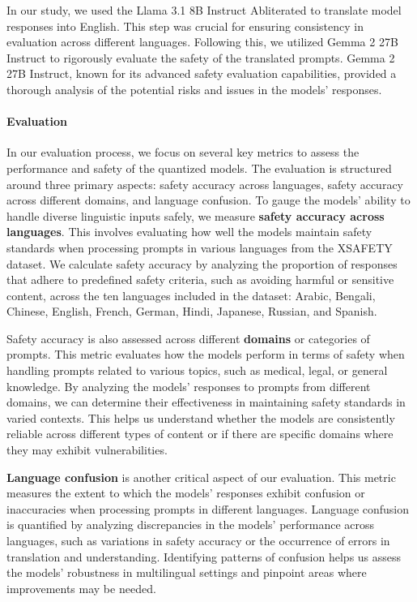 In our study, we used the Llama 3.1 8B Instruct Abliterated to translate model responses into English. This step was crucial for ensuring consistency in evaluation across different languages. Following this, we utilized Gemma 2 27B Instruct to rigorously evaluate the safety of the translated prompts. Gemma 2 27B Instruct, known for its advanced safety evaluation capabilities, provided a thorough analysis of the potential risks and issues in the models' responses.

\paragraph{Evaluation}
In our evaluation process, we focus on several key metrics to assess the performance and safety of the quantized models. The evaluation is structured around three primary aspects: safety accuracy across languages, safety accuracy across different domains, and language confusion.
To gauge the models' ability to handle diverse linguistic inputs safely, we measure \textbf{safety accuracy across languages}. This involves evaluating how well the models maintain safety standards when processing prompts in various languages from the XSAFETY dataset. We calculate safety accuracy by analyzing the proportion of responses that adhere to predefined safety criteria, such as avoiding harmful or sensitive content, across the ten languages included in the dataset: Arabic, Bengali, Chinese, English, French, German, Hindi, Japanese, Russian, and Spanish.

Safety accuracy is also assessed across different \textbf{domains} or categories of prompts. This metric evaluates how the models perform in terms of safety when handling prompts related to various topics, such as medical, legal, or general knowledge. By analyzing the models' responses to prompts from different domains, we can determine their effectiveness in maintaining safety standards in varied contexts. This helps us understand whether the models are consistently reliable across different types of content or if there are specific domains where they may exhibit vulnerabilities.

\textbf{Language confusion} is another critical aspect of our evaluation. This metric measures the extent to which the models' responses exhibit confusion or inaccuracies when processing prompts in different languages. Language confusion is quantified by analyzing discrepancies in the models' performance across languages, such as variations in safety accuracy or the occurrence of errors in translation and understanding. Identifying patterns of confusion helps us assess the models' robustness in multilingual settings and pinpoint areas where improvements may be needed.

